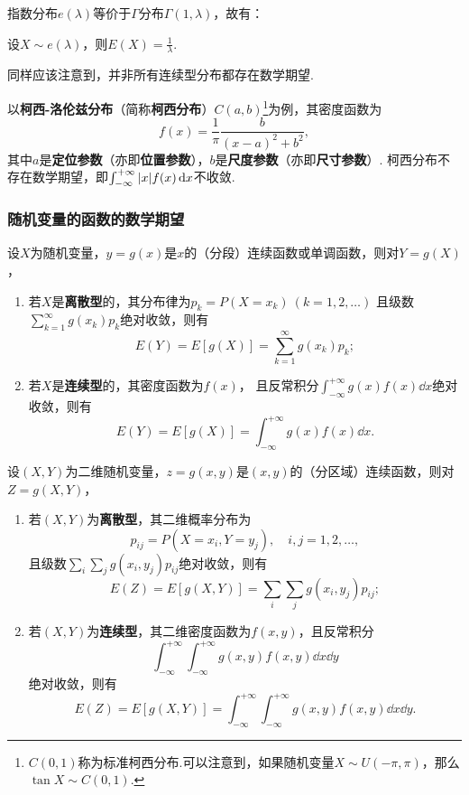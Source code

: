 指数分布\(e(\lambda)\)等价于\(\Gamma\)分布\(\Gamma(1,\lambda)\)，故有：
\begin{theorem}\label{theorem:随机变量的数字特征.指数分布的数学期望}
设\(X \sim e(\lambda)\)，则\(E(X) = \frac{1}{\lambda}\).
\end{theorem}

同样应该注意到，并非所有连续型分布都存在数学期望.

以\textbf{柯西-洛伦兹分布}（简称\textbf{柯西分布}）\(C(a,b)\)\footnote{\(C(0,1)\)称为标准柯西分布.可以注意到，如果随机变量\(X \sim U(-\pi,\pi)\)，那么\(\tan X \sim C(0,1)\).}为例，其密度函数为\[
f(x) = \frac{1}{\pi} \frac{b}{(x-a)^2+b^2},
\]其中\(a\)是\textbf{定位参数}（亦即\textbf{位置参数}），\(b\)是\textbf{尺度参数}（亦即\textbf{尺寸参数}）.
柯西分布不存在数学期望，即\(\int_{-\infty}^{+\infty} \abs{x} f(x) \dd{x}\)不收敛.

\subsubsection{随机变量的函数的数学期望}
\begin{theorem}\label{theorem:随机变量的数字特征.一维随机变量的函数的数学期望}
设\(X\)为随机变量，\(y=g(x)\)是\(x\)的（分段）连续函数或单调函数，则对\(Y=g(X)\)，%
\begin{enumerate}
\item 若\(X\)是\textbf{离散型}的，其分布律为\(p_k = P(X=x_k)\ (k=1,2,\dotsc)\)
且级数\(\sum\limits_{k=1}^\infty g(x_k) p_k\)绝对收敛，则有\[
E(Y) = E[g(X)] = \sum\limits_{k=1}^\infty {g(x_k) p_k};
\]
\item 若\(X\)是\textbf{连续型}的，其密度函数为\(f(x)\)，%
且反常积分\(\int_{-\infty}^{+\infty} g(x) f(x) \dd{x}\)绝对收敛，则有\[
E(Y) = E[g(X)] = \int_{-\infty}^{+\infty} g(x) f(x) \dd{x}.
\]
\end{enumerate}
\end{theorem}

\begin{theorem}\label{theorem:随机变量的数字特征.二维随机变量的函数的数学期望}
设\((X,Y)\)为二维随机变量，\(z=g(x,y)\)是\((x,y)\)的（分区域）连续函数，则对\(Z=g(X,Y)\)，\begin{enumerate}
\item 若\((X,Y)\)为\textbf{离散型}，其二维概率分布为\[
p_{ij} = P(X=x_i,Y=y_j), \quad i,j=1,2,\dotsc,
\]且级数\(\sum\limits_i \sum\limits_j g(x_i,y_j) p_{ij}\)绝对收敛，则有\[
E(Z) = E[g(X,Y)] = \sum\limits_i \sum\limits_j g(x_i,y_j) p_{ij};
\]
\item 若\((X,Y)\)为\textbf{连续型}，其二维密度函数为\(f(x,y)\)，且反常积分\[
\int_{-\infty}^{+\infty} \int_{-\infty}^{+\infty} g(x,y) f(x,y) \dd{x}\dd{y}
\]绝对收敛，则有\[
E(Z) = E[g(X,Y)] = \int_{-\infty}^{+\infty} \int_{-\infty}^{+\infty} g(x,y) f(x,y) \dd{x}\dd{y}.
\]
\end{enumerate}
\end{theorem}

